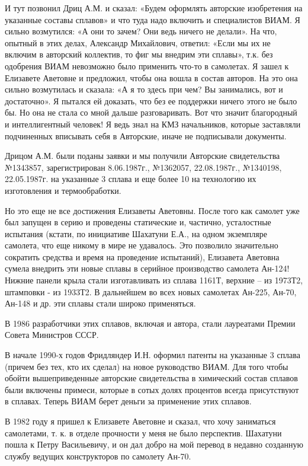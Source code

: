 И тут позвонил Дриц А.М. и сказал: «Будем оформлять авторские изобретения на
указанные составы сплавов» и что туда надо включить и специалистов ВИАМ. Я
сильно возмутился: «А они то зачем? Они ведь ничего не делали». На что, опытный
в этих делах, Александр Михайлович, ответил: «Если мы их не включим в авторский
коллектив, то фиг мы внедрим эти сплавы», т.к. без одобрения ВИАМ невозможно
было применить что-то в самолетах. Я зашел к Елизавете Аветовне и предложил,
чтобы она вошла в состав авторов. На это она сильно возмутилась и сказала: «А я
то здесь при чем? Вы занимались, вот и достаточно». Я пытался ей доказать, что
без ее поддержки ничего этого не было бы. Но она не стала со мной дальше
разговаривать. Вот что значит благородный и интеллигентный человек! Я ведь знал
на КМЗ начальников, которые заставляли подчиненных вписывать себя в Авторские,
иначе не подписывали документы.

Дрицом А.М. были поданы заявки и мы получили Авторские свидетельства №1343857,
зарегистрирован 8.06.1987г., №1362057, 22.08.1987г., №1340198, 22.05.1987г. на
указанные 3 сплава и еще более 10 на технологию их изготовления и
термообработки.


Но это еще не все достижения Елизаветы Аветовны. После того как самолет уже был
запущен в серию и проведены статические и, частично, усталостные испытания
(кстати, по инициативе Шахатуни Е.А., на одном экземпляре самолета, что еще
никому в мире не удавалось. Это позволило значительно сократить средства и
время на проведение испытаний), Елизавета Аветовна сумела внедрить эти новые
сплавы в серийное производство самолета Ан-124! Нижние панели крыла стали
изготавливать из сплава 1161Т, верхние – из 1973Т2, штамповки - из 1933Т2. В
дальнейшем во всех новых самолетах Ан-225, Ан-70, Ан-148 и др. эти сплавы стали
широко применяться.

В 1986 разработчики этих сплавов, включая и автора, стали лауреатами Премии
Совета Министров СССР.

В начале 1990-х годов Фридляндер И.Н. оформил патенты на указанные 3 сплава
(причем без тех, кто их сделал) на новое руководство ВИАМ. Для того чтобы
обойти вышеприведенные авторские свидетельства в химический состав сплавов были
включены примеси, которые в сотых долях процентов всегда присутствуют в
сплавах. Теперь ВИАМ берет деньги за применение этих сплавов.

В 1982 году я пришел к Елизавете Аветовне и сказал, что хочу заниматься
самолетами, т. к. в отделе прочности у меня не было перспектив. Шахатуни пошла
к Петру Васильевичу, и он дал добро на мой перевод в недавно созданную службу
ведущих конструкторов по самолету Ан-70.

